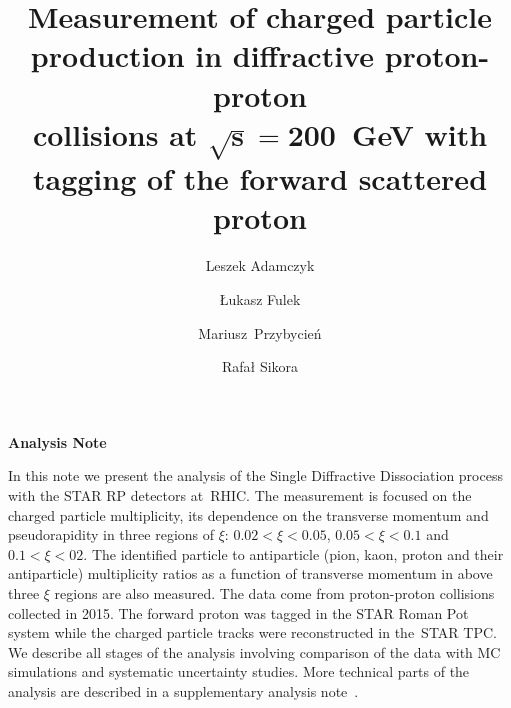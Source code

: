 \documentclass[a4paper,10pt,notitlepage]{report}
\title{\textbf{Measurement of charged particle production in diffractive proton-proton\\ collisions at $\mathbf{\sqrt{s}=200}$~GeV with tagging of the forward scattered proton}\vspace*{10pt}}
\author[1]{Leszek Adamczyk}
\author[1]{Łukasz Fulek}
\author[1]{\mbox{Mariusz Przybycień}}
\author[1]{Rafał Sikora}
\affil[1]{AGH University of Science and Technology, FPACS, Kraków, Poland}
\begin{document}
\makeatletter
\setlength{\@fptop}{0pt}
\makeatother

\begin{center}
	\textbf{\LARGE{Analysis Note}}
	
	\begin{minipage}{\linewidth}
		\maketitle
			In this note we present the analysis of the Single Diffractive Dissociation process with the STAR \ac{RP} detectors at~RHIC. The measurement is focused on the charged particle
			multiplicity, its dependence on the transverse momentum  and pseudorapidity   in  three regions of $\xi$: $0.02<\xi <0.05$, $0.05<\xi<0.1$ and $0.1<\xi<02$.  The identified particle to antiparticle (pion, kaon, proton and their antiparticle) multiplicity ratios as a function of transverse momentum in above three $\xi$ regions  are also measured. The data come from proton-proton collisions collected in 2015. The forward proton was tagged in the STAR Roman Pot system while the charged particle tracks were reconstructed in the~STAR \ac{TPC}. 
			We describe all stages of the analysis involving comparison of the data with MC simulations and systematic uncertainty studies.
			More technical parts of the analysis  are described in a supplementary analysis note~\cite{supplementaryNote}.	
		\thispagestyle{empty}
	\end{minipage}

\end{center}


\newpage








\tableofcontents
\setcounter{page}{1}



\newpage
\setcounter{page}{1}







%










\begin{appendices}
	
	
	
\end{appendices}
\end{document}
